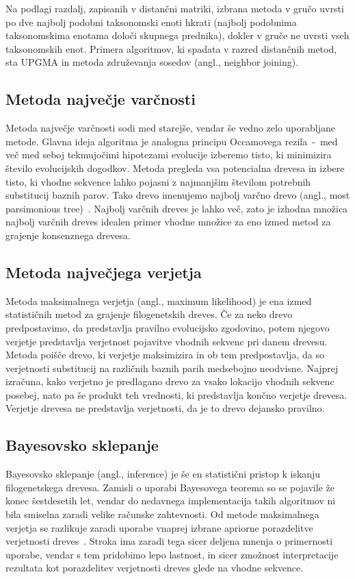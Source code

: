 \documentclass[a4paper, 12pt]{book}
\begin{document}
\noindent Na podlagi razdalj, zapisanih v distančni matriki, izbrana metoda v gručo 
uvrsti po dve najbolj podobni taksonomski enoti hkrati (najbolj
podobnima taksonomskima enotama določi skupnega prednika), dokler v 
gruče ne uvrsti vseh taksonomskih enot. Primera algoritmov, ki spadata v razred 
distančnih metod, sta UPGMA in metoda združevanja sosedov (angl., neighbor joining). 

\subsection{Metoda največje varčnosti}
Metoda največje varčnosti sodi med starejše, vendar še vedno zelo uporabljane 
metode. Glavna ideja algoritma je analogna principu Occamovega rezila~-~med več 
med seboj tekmujočimi hipotezami evolucije izberemo tisto, ki minimizira število 
evolucijskih dogodkov. Metoda pregleda vsa potencialna drevesa in izbere tisto, 
ki vhodne sekvence lahko pojasni z najmanjšim številom potrebnih substitucij 
baznih parov. Tako drevo imenujemo najbolj varčno drevo 
(angl., most parsimonious tree)~\cite{parsimony}. Najbolj varčnih dreves je lahko
več, zato je izhodna množica najbolj varčnih dreves idealen primer vhodne množice 
za eno izmed metod za grajenje konsenznega drevesa.

\subsection{Metoda največjega verjetja}
Metoda maksimalnega verjetja (angl., maximum likelihood) je ena izmed statističnih
metod za grajenje filogenetskih dreves. Če za neko drevo predpostavimo, da predstavlja
pravilno evolucijsko zgodovino, potem njegovo verjetje predstavlja verjetnost 
pojavitve vhodnih sekvenc pri danem drevesu. Metoda poišče drevo, ki verjetje 
maksimizira in ob tem predpostavlja, da so verjetnosti substitucij na različnih 
baznih parih medsebojno neodvisne. Najprej izračuna, kako verjetno je predlagano 
drevo za vsako lokacijo vhodnih sekvenc posebej, nato pa še produkt teh vrednosti, 
ki predstavlja končno verjetje drevesa. Verjetje drevesa ne predstavlja verjetnosti, 
da je to drevo dejansko pravilno. 

\subsection{Bayesovsko sklepanje}
Bayesovsko sklepanje (angl., inference) je še en statistični pristop k iskanju filogenetskega drevesa. 
Zamisli o uporabi Bayesovega teorema so se pojavile že konec šestdesetih let, 
vendar do nedavnega implementacija takih algoritmov ni bila smiselna zaradi velike
računske zahtevnosti. Od metode maksimalnega verjetja se razlikuje zaradi uporabe 
vnaprej izbrane apriorne porazdelitve verjetnosti dreves~\cite{fel}. Stroka ima 
zaradi tega sicer deljena mnenja o primernosti uporabe, vendar s tem pridobimo 
lepo lastnost, in sicer zmožnost interpretacije rezultata kot porazdelitev 
verjetnosti dreves glede na vhodne sekvence.
\end{document}
